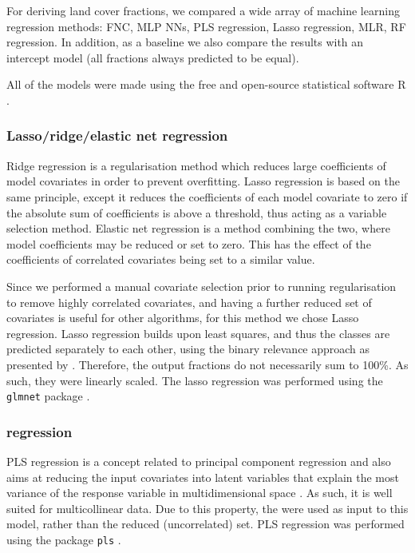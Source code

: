 \documentclass[a4paper,10pt]{article}
\begin{document}
For deriving land cover fractions, we compared a wide array of machine learning regression methods: \ac{FNC}, \ac{MLP} \glspl{NN}, \ac{PLS} regression, Lasso regression, \ac{MLR}, \ac{RF} regression.
In addition, as a baseline we also compare the results with an intercept model (all fractions always predicted to be equal).

All of the models were made using the free and open-source statistical software R \citep{r_2019}.

\subsubsection{Lasso/ridge/elastic net regression}

Ridge regression is a regularisation method which reduces large coefficients of model covariates in order to prevent overfitting.
Lasso regression is based on the same principle, except it reduces the coefficients of each model covariate to zero if the absolute sum of coefficients is above a threshold, thus acting as a variable selection method.
Elastic net regression is a method combining the two, where model coefficients may be reduced or set to zero.
This has the effect of the coefficients of correlated covariates being set to a similar value.

Since we performed a manual covariate selection prior to running regularisation to remove highly correlated covariates, and having a further reduced set of covariates is useful for other algorithms, for this method we chose Lasso regression.
Lasso regression builds upon least squares, and thus the classes are predicted separately to each other, using the binary relevance approach as presented by \citet{karalas2016br}.
Therefore, the output fractions do not necessarily sum to 100\%.
As such, they were linearly scaled.
The lasso regression was performed using the \texttt{glmnet} package \citep{glmnet}.

\subsubsection{ regression}

\ac{PLS} regression is a concept related to principal component regression and also aims at reducing the input covariates into latent variables that explain the most variance of the response variable in multidimensional space \citep{martens_multivariate_1992}.
As such, it is well suited for multicollinear data.
Due to this property, the  were used as input to this model, rather than the reduced (uncorrelated) set.
\ac{PLS} regression was performed using the package \texttt{pls} \citep{pls}.
\end{document}
